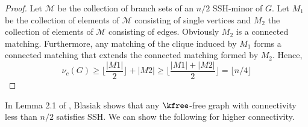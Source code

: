 
\begin{proof}
Let $\mathcal{M}$ be the collection of branch sets of an $n/2$ SSH-minor of $G$. Let $M_1$ be the collection of elements of $\mathcal{M}$ consisting of single vertices and $M_2$ the collection of elements of $\mathcal{M}$ consisting of edges.  Obviously $M_2$  is a connected matching.  Furthermore, any matching of the clique induced by $M_1$ forms a connected matching that extends the connected matching formed by $M_2$.  Hence, 
\[\nu_c(G) \geq \lfloor\frac{|M1|}{2}\rfloor + |M2| \geq \lfloor\frac{|M1 | + |M2 |}{2}\rfloor = \lfloor n/4\rfloor\]
\end{proof}

In Lemma 2.1 of \cite{Blas}, Blasiak shows that any $\kfree$-free graph with connectivity less
than $n/2$ satisfies SSH. We can show the following for higher connectivity.  


